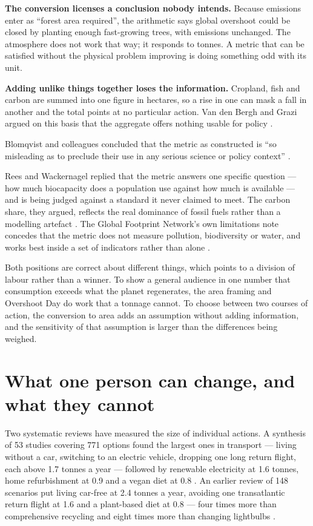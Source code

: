 \documentclass[11pt,a4paper]{article}
\begin{document}
\textbf{The conversion licenses a conclusion nobody intends.} Because emissions enter
as \enquote{forest area required}, the arithmetic says global overshoot could be
closed by planting enough fast-growing trees, with emissions unchanged. The atmosphere
does not work that way; it responds to tonnes. A metric that can be satisfied without
the physical problem improving is doing something odd with its unit.

\textbf{Adding unlike things together loses the information.} Cropland, fish and
carbon are summed into one figure in hectares, so a rise in one can mask a fall in
another and the total points at no particular action. Van den Bergh and Grazi argued
on this basis that the aggregate offers nothing usable for policy \cite{vandenbergh}.

Blomqvist and colleagues concluded that the metric as constructed is \enquote{so
misleading as to preclude their use in any serious science or policy context}
\cite{blomqvist}.

Rees and Wackernagel replied that the metric answers one specific question — how much
biocapacity does a population use against how much is available — and is being judged
against a standard it never claimed to meet. The carbon share, they argued, reflects
the real dominance of fossil fuels rather than a modelling artefact \cite{rees}. The
Global Footprint Network's own limitations note concedes that the metric does not
measure pollution, biodiversity or water, and works best inside a set of indicators
rather than alone \cite{gfn-limits}.

Both positions are correct about different things, which points to a division of
labour rather than a winner. To show a general audience in one number that
consumption exceeds what the planet regenerates, the area framing and Overshoot Day
do work that a tonnage cannot. To choose between two courses of action, the
conversion to area adds an assumption without adding information, and the
sensitivity of that assumption is larger than the differences being weighed.

\section{What one person can change, and what they cannot}

Two systematic reviews have measured the size of individual actions. A synthesis of
53 studies covering 771 options found the largest ones in transport — living without
a car, switching to an electric vehicle, dropping one long return flight, each above
1.7 tonnes a year — followed by renewable electricity at 1.6 tonnes, home
refurbishment at 0.9 and a vegan diet at 0.8 \cite{ivanova}. An earlier review of 148
scenarios put living car-free at 2.4 tonnes a year, avoiding one transatlantic return
flight at 1.6 and a plant-based diet at 0.8 — four times more than comprehensive
recycling and eight times more than changing lightbulbs \cite{wynes}.
\end{document}
